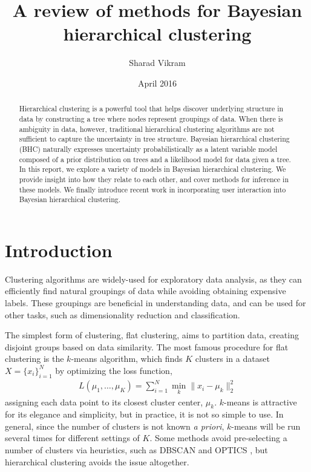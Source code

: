 \documentclass{article}
\title{A review of methods for Bayesian hierarchical clustering}
\author{Sharad Vikram}
\date{April 2016}
\begin{document}
\maketitle

\begin{abstract}
Hierarchical clustering is a powerful
tool that helps discover underlying
structure in data by constructing a tree
where nodes represent
groupings of data.
When there is ambiguity in data,
however, traditional hierarchical clustering
algorithms are not sufficient
to capture the uncertainty in tree structure.
Bayesian hierarchical clustering (BHC)
naturally expresses uncertainty probabilistically
as a latent variable model composed
of a prior distribution on trees
and a likelihood model for data given a tree.
In this report, we explore a variety
of models in Bayesian hierarchical clustering.
We provide insight into how they relate to each other,
and cover methods for inference in these models.
We finally introduce recent work in incorporating
user interaction into Bayesian hierarchical clustering.
\end{abstract}

\section{Introduction}
Clustering algorithms are widely-used for exploratory
data analysis, as they can efficiently find
natural groupings of data while avoiding
obtaining expensive labels.
These groupings are beneficial
in understanding data,
and can be used for other tasks,
such as dimensionality reduction 
and classification.

The simplest form of clustering,
flat clustering,
aims to partition data,
creating disjoint groups
based on data similarity.
The most famous procedure
for flat clustering is the
$k$-means algorithm,
which finds $K$
clusters in a dataset $X = \{x_i\}_{i = 1}^N$
by optimizing the loss function,
\begin{align}
    L(\mu_1,\ldots,\mu_K) = \sum_{i = 1}^N\min_{k} \|x_i - \mu_k\|^2_2
\end{align}
assigning each data point to its closest cluster center, $\mu_k$.
$k$-means is attractive
for its elegance and simplicity,
but in practice, it is not so simple to use.
In general, since the number of clusters is not known
\emph{a priori}, $k$-means will be run
several times for different settings of $K$.
Some methods avoid
pre-selecting a number of clusters
via heuristics, such as
DBSCAN \citep{Ester1996} and OPTICS \citep{Ankerst1999},
but hierarchical clustering avoids
the issue altogether.
\end{document}

